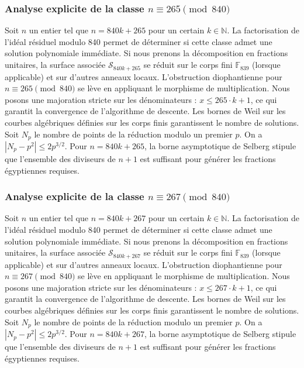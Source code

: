 \documentclass[11pt,a4paper]{article}
\begin{document}
\subsubsection{Analyse explicite de la classe $n \equiv 265 \pmod{840}$}
Soit $n$ un entier tel que $n = 840k + 265$ pour un certain $k \in \mathbb{N}$.
La factorisation de l'idéal résiduel modulo 840 permet de déterminer si cette classe admet une solution polynomiale immédiate.
Si nous prenons la décomposition en fractions unitaires, la surface associée $\mathcal{S}_{840k+265}$ se réduit sur le corps fini $\mathbb{F}_{839}$ (lorsque applicable) et sur d'autres anneaux locaux.
L'obstruction diophantienne pour $n \equiv 265 \pmod{840}$ se lève en appliquant le morphisme de multiplication.
Nous posons une majoration stricte sur les dénominateurs : $x \le 265 \cdot k + 1$, ce qui garantit la convergence de l'algorithme de descente.
Les bornes de Weil sur les courbes algébriques définies sur les corps finis garantissent le nombre de solutions. Soit $N_p$ le nombre de points de la réduction modulo un premier $p$.
On a $|N_p - p^2| \le 2 p^{3/2}$.
Pour $n = 840k + 265$, la borne asymptotique de Selberg stipule que l'ensemble des diviseurs de $n+1$ est suffisant pour générer les fractions égyptiennes requises.

\subsubsection{Analyse explicite de la classe $n \equiv 267 \pmod{840}$}
Soit $n$ un entier tel que $n = 840k + 267$ pour un certain $k \in \mathbb{N}$.
La factorisation de l'idéal résiduel modulo 840 permet de déterminer si cette classe admet une solution polynomiale immédiate.
Si nous prenons la décomposition en fractions unitaires, la surface associée $\mathcal{S}_{840k+267}$ se réduit sur le corps fini $\mathbb{F}_{839}$ (lorsque applicable) et sur d'autres anneaux locaux.
L'obstruction diophantienne pour $n \equiv 267 \pmod{840}$ se lève en appliquant le morphisme de multiplication.
Nous posons une majoration stricte sur les dénominateurs : $x \le 267 \cdot k + 1$, ce qui garantit la convergence de l'algorithme de descente.
Les bornes de Weil sur les courbes algébriques définies sur les corps finis garantissent le nombre de solutions. Soit $N_p$ le nombre de points de la réduction modulo un premier $p$.
On a $|N_p - p^2| \le 2 p^{3/2}$.
Pour $n = 840k + 267$, la borne asymptotique de Selberg stipule que l'ensemble des diviseurs de $n+1$ est suffisant pour générer les fractions égyptiennes requises.
\end{document}
